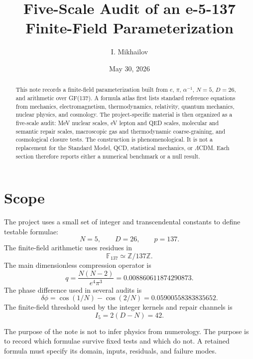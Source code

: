 \documentclass[11pt]{article}
\title{Five-Scale Audit of an e-5-137 Finite-Field Parameterization}
\author{I. Mikhailov}
\affil{Independent Researcher, Moscow, Russia}
\date{May 30, 2026}
\begin{document}
\maketitle

\begin{abstract}
This note records a finite-field parameterization built from $e$, $\pi$,
$\alpha^{-1}$, $N=5$, $D=26$, and arithmetic over GF(137).  A formula atlas
first lists standard reference equations from mechanics, electromagnetism,
thermodynamics, relativity, quantum mechanics, nuclear physics, and cosmology.
The project-specific material is then organized as a five-scale audit: MeV
nuclear scales, eV lepton and QED scales, molecular and semantic repair
scales, macroscopic gas and thermodynamic coarse-graining, and cosmological
closure tests.  The construction is phenomenological.  It is not a replacement
for the Standard Model, QCD, statistical mechanics, or $\Lambda$CDM.  Each
section therefore reports either a numerical benchmark or a null result.
\end{abstract}

\section{Scope}

The project uses a small set of integer and transcendental constants to define
testable formulae:
\begin{equation}
    N=5,\qquad D=26,\qquad p=137.
\end{equation}
The finite-field arithmetic uses residues in
\begin{equation}
    \mathbb{F}_{137}\simeq\mathbb{Z}/137\mathbb{Z}.
\end{equation}
The main dimensionless compression operator is
\begin{equation}
    q=\frac{N(N-2)}{e^4\pi^3}
      =0.008860611874290873.
\end{equation}
The phase difference used in several audits is
\begin{equation}
    \delta\phi=\cos(1/N)-\cos(2/N)
              =0.05900558383835652.
\end{equation}
The finite-field threshold used by the integer kernels and repair channels is
\begin{equation}
    I_5=2(D-N)=42.
\end{equation}

The purpose of the note is not to infer physics from numerology.  The purpose
is to record which formulae survive fixed tests and which do not.  A retained
formula must specify its domain, inputs, residuals, and failure modes.
\end{document}
